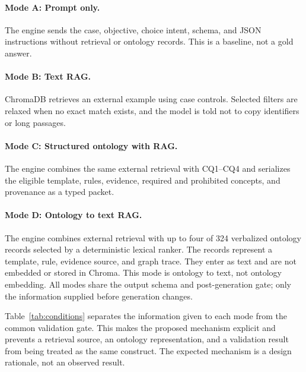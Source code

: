 \documentclass[runningheads]{llncs}
\begin{document}
\paragraph{Mode A: Prompt only.}
The engine sends the case, objective, choice intent, schema, and JSON instructions
without retrieval or ontology records. This is a baseline, not a gold answer.

\paragraph{Mode B: Text RAG.}
ChromaDB retrieves an external example using case controls. Selected filters are
relaxed when no exact match exists, and the model is told not to copy identifiers
or long passages.

\paragraph{Mode C: Structured ontology with RAG.}
The engine combines the same external retrieval with CQ1--CQ4 and serializes the
eligible template, rules, evidence, required and prohibited concepts, and
provenance as a typed packet.

\paragraph{Mode D: Ontology to text RAG.}
The engine combines external retrieval with up to four of 324 verbalized ontology
records selected by a deterministic lexical ranker. The records represent a
template, rule, evidence source, and graph trace. They enter as text and are not
embedded or stored in Chroma. This mode is ontology to text, not ontology
embedding. All modes share the output schema and post-generation gate; only the
information supplied before generation changes.

Table~\ref{tab:conditions} separates the information given to each mode from the
common validation gate. This makes the proposed mechanism explicit and prevents a
retrieval source, an ontology representation, and a validation result from being
treated as the same construct. The expected mechanism is a design rationale, not
an observed result.
\end{document}
